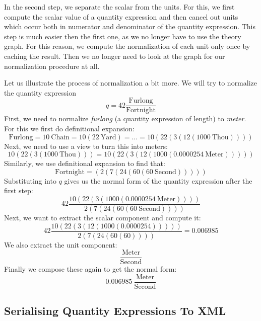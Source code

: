 In the second step, we separate the scalar from the units. For this, we first compute the scalar value of a quantity expression and then cancel out units which occur both in numerator and denominator of the quantity expression. This step is much easier then the first one, as we no longer have to use the theory graph. For this reason, we compute the normalization of each unit only once by caching the result. Then we no longer need to look at the graph for our normalization procedure at all.

Let us illustrate the process of normalization a bit more. We will try to normalize the quantity expression
\[q = 42 \frac{\text{Furlong}}{\text{Fortnight}}\]
First, we need to normalize \textit{furlong} (a quantity expression of length) to \textit{meter}. For this we first do definitional expansion:
\[\text{Furlong} = 10\ \text{Chain} = 10 \left( 22\ \text{Yard}\right) = \dots = 10 \left( 22 \left( 3 \left( 12 \left( 1000\ \text{Thou} \right) \right) \right)\right) \]
Next, we need to use a view to turn this into meters:
\[10 \left( 22 \left( 3 \left( 1000\ \text{Thou} \right) \right)\right) = 10 \left( 22 \left( 3 \left( 12 \left( 1000 \left( 0.0000254\ \text{Meter} \right) \right) \right) \right)\right)\]
Similarly, we use definitional expansion to find that:
\[\text{Fortnight} = \left( 2 \left( 7 \left( 24 \left( 60 \left( 60\ \text{Second} \right) \right) \right) \right) \right) \]
Substituting into $q$ gives us the normal form of the quantity expression after the first step:
\[42 \frac{10 \left( 22 \left( 3 \left( 1000 \left( 0.0000254\ \text{Meter} \right) \right) \right)\right)}{ 2 \left( 7 \left( 24 \left( 60 \left( 60\ \text{Second} \right) \right) \right) \right)}\]
Next, we want to extract the scalar component and compute it:
\[42 \frac{10 \left( 22 \left( 3 \left( 12 \left( 1000 \left( 0.0000254 \right) \right) \right) \right)\right)}{ 2 \left( 7 \left( 24 \left( 60 \left( 60\right) \right) \right) \right)} = 0.006985 \]
We also extract the unit component:
\[\frac{\text{Meter}}{\text{Second}}\]
Finally we compose these again to get the normal form:
\[0.006985\ \frac{\text{Meter}}{\text{Second}}\]

\subsection{Serialising Quantity Expressions To XML}
\label{sec:xml}

